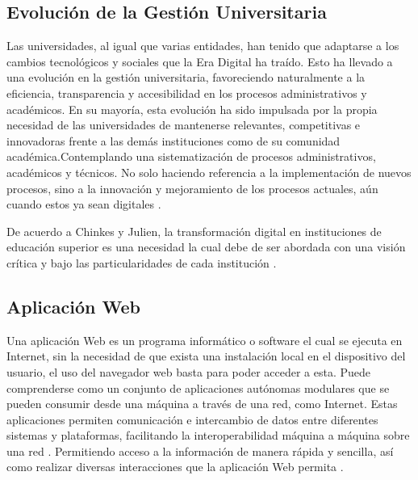     \subsection{Evolución de la Gestión Universitaria}
    Las universidades, al igual que varias entidades, han tenido que adaptarse a los cambios tecnológicos y sociales que 
    la Era Digital ha traído. Esto ha llevado a una evolución en la gestión universitaria, favoreciendo naturalmente a 
    la eficiencia, transparencia y accesibilidad en los procesos administrativos y académicos. En su mayoría, esta 
    evolución ha sido impulsada por la propia necesidad de las universidades de mantenerse relevantes, competitivas e 
    innovadoras frente a las demás instituciones como de su comunidad académica.Contemplando una sistematización de 
    procesos administrativos, académicos y técnicos. No solo haciendo referencia a la implementación de nuevos procesos, 
    sino a la innovación y mejoramiento de los procesos actuales, aún cuando estos ya sean digitales 
    \cite{chinkes2019transformacionDigital,cueva2020transformacionDigital}.
    
    De acuerdo a Chinkes y Julien, la transformación digital en instituciones de educación superior
    es una necesidad la cual debe de ser abordada con una visión crítica y bajo las particularidades de cada institución
    \cite{chinkes2019transformacionDigital}.


    \subsection{Aplicación Web}
    Una aplicación Web es un programa informático o software el cual se ejecuta en Internet, sin la necesidad de que 
    exista una instalación local en el dispositivo del usuario, el uso del navegador web basta para poder acceder a esta.
    Puede comprenderse como un conjunto de aplicaciones autónomas modulares que se pueden consumir desde una máquina a 
    través de una red, como Internet. Estas aplicaciones permiten comunicación e intercambio de datos entre diferentes 
    sistemas y plataformas, facilitando la interoperabilidad máquina a máquina sobre una red \cite{ibm2025WebServices}.
    Permitiendo acceso a la información de manera rápida y sencilla, así como realizar diversas interacciones que la 
    aplicación Web permita \cite{pardo2018comparacion}.

